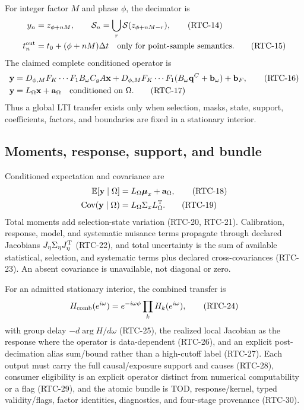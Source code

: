 \documentclass[11pt]{article}
\newcommand{\E}{\mathbb{E}}
\newcommand{\Cov}{\operatorname{Cov}}
\begin{document}
For integer factor $M$ and phase $\phi$, the decimator is
\begin{align}
y_n&=z_{\phi+nM},\qquad
\mathcal S_n=\bigcup_r\mathcal S(z_{\phi+nM-r}),
\tag{RTC-14}\\
t^{\rm out}_n&=t_0+(\phi+nM)\Delta t
\quad\hbox{only for point-sample semantics.}
\tag{RTC-15}
\end{align}
The claimed complete conditioned operator is
\begin{align}
\mathbf y&=D_{\phi,M}F_K\cdots F_1B_\omega C_gA\mathbf x
 +D_{\phi,M}F_K\cdots F_1(B_\omega\mathbf q^C+\mathbf b_\omega)
 +\mathbf b_F,
\tag{RTC-16}\\
\mathbf y&=L_\Omega\mathbf x+\mathbf a_\Omega
\quad\hbox{conditioned on }\Omega.
\tag{RTC-17}
\end{align}
Thus a global LTI transfer exists only when selection, masks, state, support,
coefficients, factors, and boundaries are fixed in a stationary interior.

\subsection{Moments, response, support, and bundle}

Conditioned expectation and covariance are
\begin{align}
\E[\mathbf y\mid\Omega]&=L_\Omega\boldsymbol\mu_x+\mathbf a_\Omega,
\tag{RTC-18}\\
\Cov(\mathbf y\mid\Omega)&=L_\Omega\Sigma_xL_\Omega^{\rm T}.
\tag{RTC-19}
\end{align}
Total moments add selection-state variation (RTC-20, RTC-21).  Calibration,
response, model, and systematic nuisance terms propagate through declared
Jacobians $J_\eta\Sigma_\eta J_\eta^{\rm T}$ (RTC-22), and total uncertainty
is the sum of available statistical, selection, and systematic terms plus
declared cross-covariances (RTC-23).  An absent covariance is unavailable,
not diagonal or zero.

For an admitted stationary interior, the combined transfer is
\begin{equation}
H_{\rm comb}(e^{i\omega})=e^{-i\omega\phi}
 \prod_k H_k(e^{i\omega}),
\tag{RTC-24}
\end{equation}
with group delay $-d\arg H/d\omega$ (RTC-25), the realized local Jacobian as
the response where the operator is data-dependent (RTC-26), and an explicit
post-decimation alias sum/bound rather than a high-cutoff label (RTC-27).
Each output must carry the full causal/exposure support and causes (RTC-28),
consumer eligibility is an explicit operator distinct from numerical
computability or a flag (RTC-29), and the atomic bundle is TOD, response/kernel,
typed validity/flags, factor identities, diagnostics, and four-stage provenance
(RTC-30).
\end{document}
